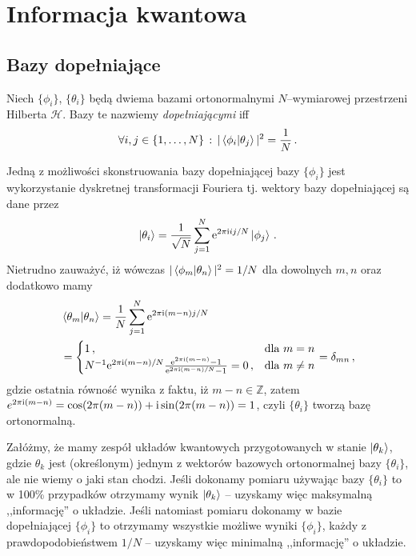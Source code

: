 \documentclass{myclass}
\begin{document}
\section{Informacja kwantowa}

\subsection{Bazy dopełniające}
\begin{definition}
    Niech \(\{\phi_i\}\), \(\{\theta_i\}\)  będą dwiema bazami ortonormalnymi \(N\)--wymiarowej
    przestrzeni Hilberta \(\mathscr{H}\). Bazy te nazwiemy \textit{dopełniającymi} iff
    \begin{equation*}
        \forall i,j\in\{1,\ldots,N\}\,:\, |\braket{\phi_i}{\theta_j}|^2 = \frac{1}{N}\,.
    \end{equation*}
\end{definition}
Jedną z możliwości skonstruowania bazy dopełniającej bazy \(\{\phi_i\}\) jest wykorzystanie
dyskretnej transformacji Fouriera tj. wektory bazy dopełniającej są dane przez
\begin{equation*}
    \ket{\theta_i} = \frac{1}{\sqrt{N}}\sum_{j=1}^N \mathrm{e}^{2\pi\mathrm{i} ij/N}\ket{\phi_j}\,.
\end{equation*}
Nietrudno zauważyć, iż wówczas \(|\braket{\phi_m}{\theta_n}|^2 = 1/N\) dla dowolnych \(m, n\) oraz
dodatkowo mamy
\begin{equation*}
    \begin{split}
        &\braket{\theta_m}{\theta_n} = \frac{1}{N}\sum_{j=1}^N \mathrm{e}^{2\pi\mathrm{i}(m - n)j/N} \\
        &= \begin{cases}
            1\,,&\text{dla \(m=n\)}\\
            N^{-1}\mathrm{e}^{2\pi\mathrm{i}(m-n)/N}\frac{\mathrm{e}^{2\pi\mathrm{i}(m-n)} - 1}{\mathrm{e}^{2\pi\mathrm{i}(m-n)/N} - 1} = 0\,,&\text{dla \(m\neq n\)}
        \end{cases} = \delta_{mn}\,,
    \end{split}
\end{equation*}
gdzie ostatnia równość wynika z faktu, iż \(m-n\in\mathbb{Z}\), zatem \(e^{2\pi\mathrm{i}(m-n)} =
\cos(2\pi(m-n)) + \mathrm{i}\sin(2\pi(m-n)) = 1\), czyli \(\{\theta_i\}\) tworzą bazę ortonormalną.

Załóżmy, że mamy zespół układów kwantowych przygotowanych w stanie \(\ket{\theta_k}\), gdzie
\(\theta_k\) jest (określonym) jednym z wektorów bazowych ortonormalnej bazy \(\{\theta_i\}\), ale
nie wiemy o jaki stan chodzi. Jeśli dokonamy pomiaru używając bazy \(\{\theta_i\}\) to w 100\%
przypadków otrzymamy wynik \(\ket{\theta_k}\) -- uzyskamy więc maksymalną ,,informację'' o układzie.
Jeśli natomiast pomiaru dokonamy w bazie dopełniającej \(\{\phi_i\}\) to otrzymamy wszystkie możliwe
wyniki \(\{\phi_i\}\), każdy z prawdopodobieństwem \(1/N\) -- uzyskamy więc minimalną ,,informację''
o układzie.
\end{document}
